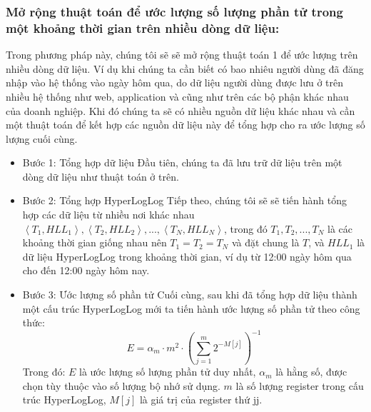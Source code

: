 \documentclass[letterpaper,13pt]{article}
\theoremstyle{mytheor}
\begin{document}
\subsubsection{Mở rộng thuật toán để ước lượng số lượng phần tử trong một khoảng thời gian trên nhiều dòng dữ liệu:}
Trong phương pháp này, chúng tôi sẽ sẽ mở rộng thuật toán 1 để ước lượng trên nhiều dòng dữ liệu. Ví dụ khi chúng ta cần biết có bao nhiêu người dùng
đã đăng nhập vào hệ thống vào ngày hôm qua, do dữ liệu người dùng được lưu ở trên nhiều hệ thống như web, application và cũng như trên các bộ phận khác nhau
của doanh nghiệp. Khi đó chúng ta sẽ có nhiều nguồn dữ liệu khác nhau và cần một thuật toán để kết hợp các nguồn dữ liệu này để tổng hợp cho ra ước lượng
số lượng cuối cùng.
\begin{itemize}
    \item Bước 1: Tổng hợp dữ liệu
    Đầu tiên, chúng ta đã lưu trữ dữ liệu trên một dòng dữ liệu như thuật toán ở trên. 
    \item Bước 2: Tổng hợp HyperLogLog
    Tiếp theo, chúng tôi sẽ sẽ tiến hành tổng hợp các dữ liệu từ nhiều nơi khác nhau $\left< T_1, HLL_1\right>, \left< T_2, HLL_2\right>,...,\left< T_N, HLL_N\right>$, 
    trong đó $T_1, T_2,...,T_N$ là các khoảng thời gian giống nhau nên $T_1 = T_2 = T_N$ và đặt chung là $T$, và $HLL_1$ là dữ liệu HyperLogLog trong khoảng thời gian, ví dụ
    từ 12:00 ngày hôm qua cho đến 12:00 ngày hôm nay.  
    \item Bước 3: Ước lượng số phần tử
    Cuối cùng, sau khi đã tổng hợp dữ liệu thành một cấu trúc HyperLogLog mới ta tiến hành ước lượng số phần tử theo công thức:
    \[E = \alpha_m \cdot m^2 \cdot \left( \sum_{j=1}^{m} 2^{-M[j]} \right)^{-1}\]
    Trong đó: $E$ là ước lượng số lượng phần tử duy nhất, 
    $\alpha_m$ là hằng số, được chọn tùy thuộc vào số lượng bộ nhớ sử dụng.
    $m$ là số lượng register trong cấu trúc HyperLogLog, $M[j]$ là giá trị của register thứ jj.

\end{itemize}
\end{document}
